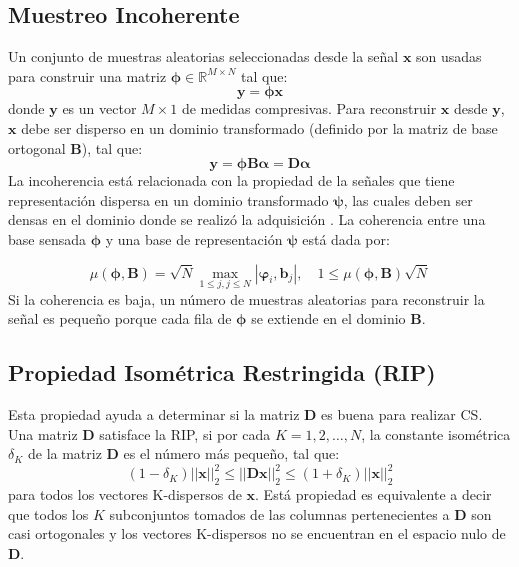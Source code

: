 \subsection{Muestreo Incoherente}

Un conjunto de muestras aleatorias seleccionadas desde la se\~nal $\boldsymbol{x}$ son usadas para construir una matriz $\boldsymbol{\phi} \in \mathbb{R}^{M \times N}$ tal que:
\begin{equation}
\boldsymbol{y} = \boldsymbol{\phi x}
\end{equation}
donde $\boldsymbol{y}$ es un vector $M\times 1$ de medidas compresivas.  Para reconstruir $\boldsymbol{x}$ desde $\boldsymbol{y}$, $\boldsymbol{x}$ debe ser disperso en un dominio transformado (definido por la matriz de base ortogonal $\boldsymbol{B}$), tal que:
\begin{equation}
\boldsymbol{y}=\boldsymbol{\phi B \alpha}= \boldsymbol{D\alpha}
\end{equation}
La incoherencia est\'a relacionada con la propiedad de la se\~nales que tiene representaci\'on dispersa en un dominio transformado $\boldsymbol{\psi}$, las cuales deben ser densas en el dominio donde se realiz\'o la adquisici\'on \cite{compressive}. La coherencia entre una base sensada $\boldsymbol{\phi}$  y una base de representaci\'on $\boldsymbol{\psi}$ est\'a dada por: 

\begin{equation}
\mu(\boldsymbol{\phi},\boldsymbol{B})= \sqrt{N} \max_{1 \leq j, j \leq N} | \boldsymbol{\varphi}_i,\boldsymbol{b}_j|, \quad 1\leq \mu(\boldsymbol{\phi},\boldsymbol{B}) \sqrt{N}
\end{equation}
Si la coherencia es baja, un n\'umero de muestras aleatorias para reconstruir la se\~nal es peque\~no porque cada fila de $\boldsymbol{\phi}$ se extiende en el dominio $\boldsymbol{B}$.

\subsection{Propiedad Isom\'etrica Restringida (RIP)}

Esta propiedad ayuda a determinar si la matriz $\boldsymbol{D}$ es  buena para realizar CS. Una matriz $\boldsymbol{D}$ satisface la RIP, si por cada $K = 1,2, \ldots, N$, la constante isom\'etrica $\delta_K$ de la matriz $\boldsymbol{D}$ es el n\'umero m\'as peque\~no, tal que: 
\begin{equation}
(1-\delta_K)||\boldsymbol{x}||_2^2 \leq ||\boldsymbol{Dx}||^2_2 \leq (1+\delta_K)||\boldsymbol{x}||^2_2
\end{equation}
para todos los vectores K-dispersos de $\boldsymbol{x}$. Est\'a propiedad es equivalente a decir que todos los $K$ subconjuntos tomados de las columnas pertenecientes a $\boldsymbol{D}$ son casi ortogonales y los vectores K-dispersos no se encuentran en el espacio nulo de $\boldsymbol{D}$.

